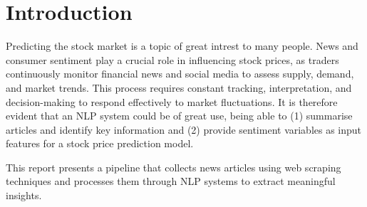\section{Introduction}


Predicting the stock market is a topic of great intrest to many people.  News and consumer sentiment play a crucial role in influencing stock prices, as traders continuously monitor financial news and social media to assess supply, demand, and market trends. This process requires constant tracking, interpretation, and decision-making to respond effectively to market fluctuations. It is therefore evident that an NLP system could be of great use, being able to (1) summarise articles and identify key information and (2) provide sentiment variables as input features for a stock price prediction model.



This report presents a pipeline that collects news articles using web scraping techniques and processes them through NLP systems to extract meaningful insights.



